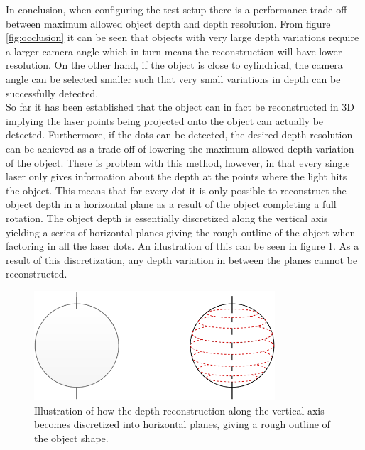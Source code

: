 In conclusion, when configuring the test setup there is a performance trade-off between maximum allowed object depth and depth resolution. From figure \ref{fig:occlusion} it can be seen that objects with very large depth variations require a larger camera angle which in turn means the reconstruction will have lower resolution. On the other hand, if the object is close to cylindrical, the camera angle can be selected smaller such that very small variations in depth can be successfully detected.\\

So far it has been established that the object can in fact be reconstructed in 3D implying the laser points being projected onto the object can actually be detected. Furthermore, if the dots can be detected, the desired depth resolution can be achieved as a trade-off of lowering the maximum allowed depth variation of the object. There is problem with this method, however, in that every single laser only gives information about the depth at the points where the light hits the object. This means that for every dot it is only possible to reconstruct the object depth in a horizontal plane as a result of the object completing a full rotation. The object depth is essentially discretized along the vertical axis yielding a series of horizontal planes giving the rough outline of the object when factoring in all the laser dots. An illustration of this can be seen in figure \ref{fig:scanlines}. As a result of this discretization, any depth variation in between the planes cannot be reconstructed.\\

\begin{figure}[h]
    \centering
    \includegraphics[width=0.8\textwidth]{figures/reconstruction/scanlines.pdf}
    \caption{Illustration of how the depth reconstruction along the vertical axis becomes discretized into horizontal planes, giving a rough outline of the object shape.}
    \label{fig:scanlines}
\end{figure}

